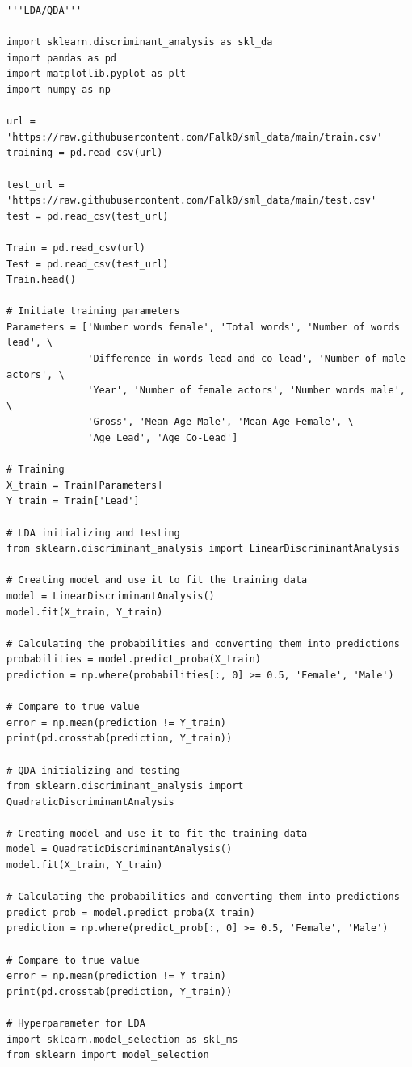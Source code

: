\documentclass{article}
\begin{document}
\begin{verbatim}
'''LDA/QDA'''

import sklearn.discriminant_analysis as skl_da
import pandas as pd
import matplotlib.pyplot as plt
import numpy as np

url = 'https://raw.githubusercontent.com/Falk0/sml_data/main/train.csv'
training = pd.read_csv(url)

test_url = 'https://raw.githubusercontent.com/Falk0/sml_data/main/test.csv'
test = pd.read_csv(test_url)

Train = pd.read_csv(url)
Test = pd.read_csv(test_url)
Train.head()

# Initiate training parameters
Parameters = ['Number words female', 'Total words', 'Number of words lead', \
              'Difference in words lead and co-lead', 'Number of male actors', \
              'Year', 'Number of female actors', 'Number words male', \
              'Gross', 'Mean Age Male', 'Mean Age Female', \
              'Age Lead', 'Age Co-Lead']

# Training
X_train = Train[Parameters]
Y_train = Train['Lead']

# LDA initializing and testing
from sklearn.discriminant_analysis import LinearDiscriminantAnalysis

# Creating model and use it to fit the training data
model = LinearDiscriminantAnalysis()
model.fit(X_train, Y_train)

# Calculating the probabilities and converting them into predictions
probabilities = model.predict_proba(X_train)
prediction = np.where(probabilities[:, 0] >= 0.5, 'Female', 'Male')

# Compare to true value
error = np.mean(prediction != Y_train)
print(pd.crosstab(prediction, Y_train))

# QDA initializing and testing
from sklearn.discriminant_analysis import QuadraticDiscriminantAnalysis

# Creating model and use it to fit the training data
model = QuadraticDiscriminantAnalysis()
model.fit(X_train, Y_train)

# Calculating the probabilities and converting them into predictions
predict_prob = model.predict_proba(X_train)
prediction = np.where(predict_prob[:, 0] >= 0.5, 'Female', 'Male')

# Compare to true value
error = np.mean(prediction != Y_train)
print(pd.crosstab(prediction, Y_train))

# Hyperparameter for LDA
import sklearn.model_selection as skl_ms
from sklearn import model_selection



\end{verbatim}
\end{document}
